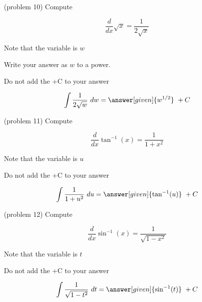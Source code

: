 \documentclass{ximera}
\begin{document}
\begin{problem}(problem 10)
Compute 

\begin{hint}
\[
\frac{d}{dx} \sqrt x = \frac{1}{2\sqrt x}
\]
\end{hint}
\begin{hint}
Note that the variable is $w$
\end{hint}
\begin{hint}
Write your answer as $w$ to a power.
\end{hint}
\begin{hint}
\begin{center}
Do not add the +C to your answer
\end{center}
\end{hint}

\[
\int \frac{1}{2\sqrt w} \ dw =
\answer[given]{w^{1/2}} \ + C
\]
\end{problem}





\begin{problem}(problem 11)
Compute 

\begin{hint}
\[
\frac{d}{dx} \tan^{-1}(x) = \frac{1}{1+x^2}
\]
\end{hint}
\begin{hint}
Note that the variable is $u$
\end{hint}
\begin{hint}
\begin{center}
Do not add the +C to your answer
\end{center}
\end{hint}

\[
\int \frac{1}{1+u^2} \ du =
\answer[given]{\tan^{-1}(u)} \ + C
\]
\end{problem}




\begin{problem}(problem 12)
Compute 

\begin{hint}
\[
\frac{d}{dx} \sin^{-1}(x) = \frac{1}{\sqrt{1 - x^2}}
\]
\end{hint}
\begin{hint}
Note that the variable is $t$
\end{hint}
\begin{hint}
\begin{center}
Do not add the +C to your answer
\end{center}
\end{hint}

\[
\int \frac{1}{\sqrt{1 - t^2}} \ dt =
\answer[given]{\sin^{-1}(t)} \ + C
\]
\end{problem}
\end{document}
